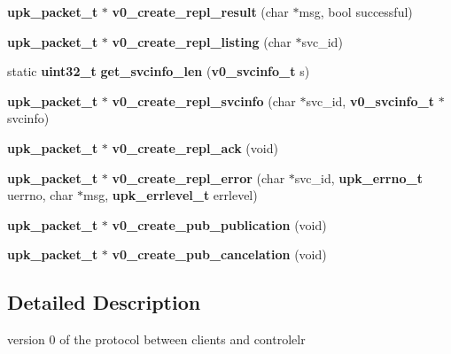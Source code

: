 \begin{DoxyCompactItemize}
{\bf upk\_\-packet\_\-t} $\ast$ {\bf v0\_\-create\_\-repl\_\-result} (char $\ast$msg, bool successful)
\item 
{\bf upk\_\-packet\_\-t} $\ast$ {\bf v0\_\-create\_\-repl\_\-listing} (char $\ast$svc\_\-id)
\item 
static {\bf uint32\_\-t} {\bf get\_\-svcinfo\_\-len} ({\bf v0\_\-svcinfo\_\-t} s)
\item 
{\bf upk\_\-packet\_\-t} $\ast$ {\bf v0\_\-create\_\-repl\_\-svcinfo} (char $\ast$svc\_\-id, {\bf v0\_\-svcinfo\_\-t} $\ast$svcinfo)
\item 
{\bf upk\_\-packet\_\-t} $\ast$ {\bf v0\_\-create\_\-repl\_\-ack} (void)
\item 
{\bf upk\_\-packet\_\-t} $\ast$ {\bf v0\_\-create\_\-repl\_\-error} (char $\ast$svc\_\-id, {\bf upk\_\-errno\_\-t} uerrno, char $\ast$msg, {\bf upk\_\-errlevel\_\-t} errlevel)
\item 
{\bf upk\_\-packet\_\-t} $\ast$ {\bf v0\_\-create\_\-pub\_\-publication} (void)
\item 
{\bf upk\_\-packet\_\-t} $\ast$ {\bf v0\_\-create\_\-pub\_\-cancelation} (void)
\end{DoxyCompactItemize}


\subsection{Detailed Description}
version 0 of the protocol between clients and controlelr 